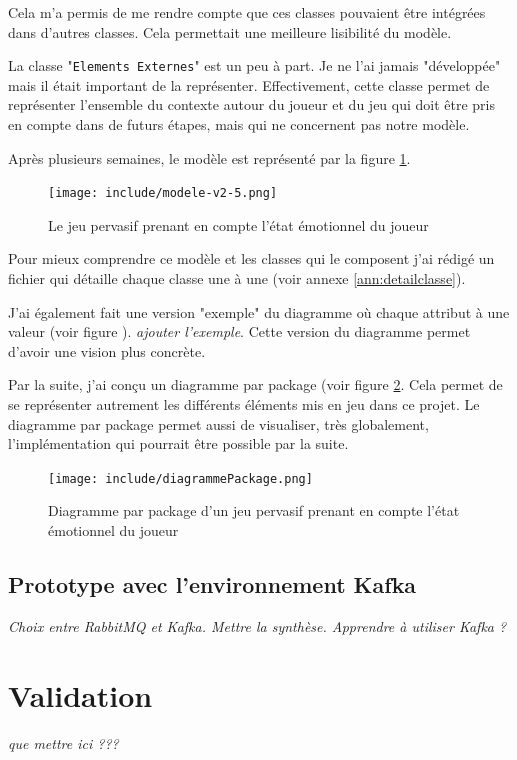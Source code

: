 \documentclass{article}
\begin{document}
		Cela m'a permis de me rendre compte que ces classes pouvaient être intégrées dans d'autres classes.
		Cela permettait une meilleure lisibilité du modèle.\par
		La classe  "\texttt{Elements Externes}" est un peu à part. 
		Je ne l'ai jamais "développée" mais il était important de la représenter.
		Effectivement, cette classe permet de représenter l'ensemble du contexte autour du joueur et du jeu qui doit être pris en compte dans de futurs étapes, mais qui ne concernent pas notre modèle.\par
		Après plusieurs semaines, le modèle est représenté par la figure \ref{fig:modele}.
		\begin{figure}
			\texttt{[image: include/modele-v2-5.png]}
			\caption{Le jeu pervasif prenant en compte l'état émotionnel du joueur}
			\label{fig:modele}
		\end{figure}
		Pour mieux comprendre ce modèle et les classes qui le composent j'ai rédigé un fichier qui détaille chaque classe une à une (voir annexe \ref{ann:detailclasse}).\par
		J'ai également fait une version "exemple" du diagramme où chaque attribut à une valeur (voir figure %
		). \textit{ajouter l'exemple}.
		Cette version du diagramme permet d'avoir une vision plus concrète.\par
		Par la suite, j'ai conçu un diagramme par package (voir figure \ref{fig:diagpack}.
		Cela permet de se représenter autrement les différents éléments mis en jeu dans ce projet.
		Le diagramme par package permet aussi de visualiser, très globalement, l'implémentation qui pourrait être possible par la suite.
		\begin{figure}
			\centering
			\texttt{[image: include/diagrammePackage.png]}
			\caption{Diagramme par package d'un jeu pervasif prenant en compte l'état émotionnel du joueur}
			\label{fig:diagpack}
		\end{figure}
	\subsection{Prototype avec l'environnement Kafka}
		\textit{Choix entre RabbitMQ et Kafka.\newline
		Mettre la synthèse.\newline
		Apprendre à utiliser Kafka ?}

\section{Validation}
	\textit{que mettre ici ???}
\end{document}
